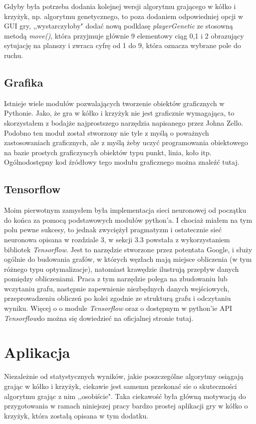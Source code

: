 \documentclass[licencjacka]{pracamgr}
\begin{document}
Gdyby była potrzeba dodania kolejnej wersji algorytmu grającego w kółko i krzyżyk, np. algorytmu genetycznego, to poza dodaniem odpowiedniej opcji w GUI gry, ,,wystarczyłoby" dodać nową podklasę \textit{playerGenetic} ze stosowną metodą \textit{move()}, która przyjmuje głównie 9 elementowy ciąg 0,1 i 2 obrazujący sytujację na planszy i zwraca cyfrę od 1 do 9, która oznacza wybrane pole do ruchu.  

\section{Grafika}
Istnieje wiele modułów pozwalających tworzenie obiektów graficznych w Pythonie. Jako, że gra w kółko i krzyżyk nie jest graficznie wymagająca, to skorzystałem z bodajże najprostszego narzędzia napisanego przez Johna Zello. Podobno ten moduł został stworzony nie tyle z myślą o poważnych zastosowaniach graficznych, ale z myślą żeby uczyć programowania obiektowego na bazie prostych graficzyncyh obiektów typu punkt, linia, koło itp.  Ogólnodostępny kod źródłowy tego modułu graficznego można znaleźć tutaj.

\section{Tensorflow}
Moim pierwotnym zamysłem była implementacja  sieci neuronowej od początku do końca za pomocą podstawowych modułów python'a. I chociaż miałem na tym polu pewne sukcesy, to jednak zwyciężył pragmatyzm i ostatecznie sieć neuronowa opisana w rozdziale 3, w sekcji 3.3 powstała z wykorzystaniem bibliotek \textit{Tensorflow}. Jest to narzędzie stworzone przez potentata Google, i służy ogólnie do budowania grafów, w których węzłach mają miejsce obliczenia (w tym różnego typu optymalizacje), natomiast krawędzie ilustrują przepływ danych pomiędzy obliczeniami. Praca z tym narzędzie polega na zbudowaniu lub wczytaniu grafu, następnie zapewnienie niezbędnych danych wejściowych, przeprowadzeniu obliczeń po kolei zgodnie ze strukturą grafu i odczytaniu wyniku.  Więcej o o module \textit{Tensorflow} oraz o dostępnym w python'ie API  \textit{Tensorflow}do  można się dowiedzieć na oficjalnej stronie tutaj.


\chapter{Aplikacja}

Niezależnie od statystycznych wyników, jakie poszczególne algorytmy osiągają grając w kółko i krzyżyk, ciekawie jest samemu przekonać sie o 
skuteczności algorytmu grając z nim	,,osobiście". Taka ciekawość była główną motywacją do przygotowania w ramach niniejszej pracy 
bardzo prostej aplikacji gry w kółko o krzyżyk, która zostałą opisana w tym dodatku. \\
\end{document}
